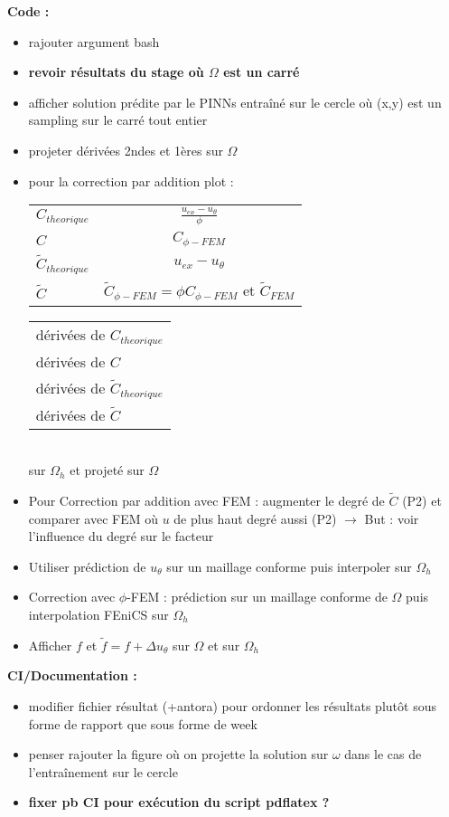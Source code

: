 \textbf{Code :}
\begin{itemize}[label=$\square$] 
	\item[\done] rajouter argument bash
	\item \textbf{revoir résultats du stage où $\Omega$ est un carré}
	\item afficher solution prédite par le PINNs entraîné sur le cercle où (x,y) est un sampling sur le carré tout entier
	\item projeter dérivées 2ndes et 1ères sur $\Omega$
	\item pour la correction par addition plot : \\
	\begin{minipage}{0.48\linewidth}
		\begin{tabular}[\linewidth]{lc}
			$C_{theorique}$ & $\frac{u_{ex}-u_\theta}{\phi}$ \\
			$C$ & $C_{\phi-FEM}$ \\
			$\tilde{C}_{theorique}$ & $u_{ex}-u_\theta$ \\
			$\tilde{C}$ & $\tilde{C}_{\phi-FEM}=\phi C_{\phi-FEM}$ et $\tilde{C}_{FEM}$
		\end{tabular}
	\end{minipage}
	\begin{minipage}{0.48\linewidth}
		\begin{tabular}[\linewidth]{l}
			dérivées de $C_{theorique}$ \\
			dérivées de $C$ \\
			dérivées de $\tilde{C}_{theorique}$ \\
			dérivées de $\tilde{C}$
		\end{tabular}
	\end{minipage} \\
	sur $\Omega_h$ et projeté sur $\Omega$
	\item Pour Correction par addition avec FEM : augmenter le degré de $\tilde{C}$ (P2) et comparer avec FEM où $u$ de plus haut degré aussi (P2) $\rightarrow$ But : voir l'influence du degré sur le facteur
	\item Utiliser prédiction de $u_\theta$ sur un maillage conforme puis interpoler sur $\Omega_h$
	\item Correction avec $\phi$-FEM : prédiction sur un maillage conforme de $\Omega$ puis interpolation FEniCS sur $\Omega_h$
	\item Afficher $f$ et $\tilde{f}=f+\Delta u_\theta$ sur $\Omega$ et sur $\Omega_h$
\end{itemize}
\textbf{CI/Documentation :}
\begin{itemize}[label=$\square$] 
	\item modifier fichier résultat (+antora) pour ordonner les résultats plutôt sous forme de rapport que sous forme de week
	\item penser rajouter la figure où on projette la solution sur $\omega$ dans le cas de l'entraînement sur le cercle
	\item \textbf{fixer pb CI pour exécution du script pdflatex ?}
\end{itemize}
